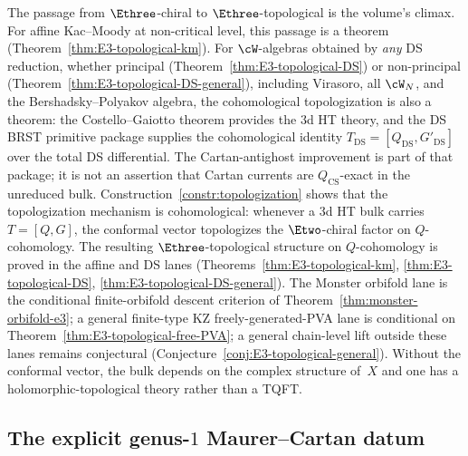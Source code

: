 \begin{remark}
\label{rem:E3-dichotomy-architecture}
The passage from $\Ethree$-chiral to $\Ethree$-topological is
the volume's climax. For affine Kac--Moody at non-critical
level, this passage is a theorem
\textup{(}Theorem~\ref{thm:E3-topological-km}\textup{)}.
For $\cW$-algebras obtained by \emph{any} DS reduction,
whether principal
\textup{(}Theorem~\ref{thm:E3-topological-DS}\textup{)} or
non-principal
\textup{(}Theorem~\ref{thm:E3-topological-DS-general}\textup{)},
including Virasoro, all $\cW_N$, and the Bershadsky--Polyakov
algebra, the cohomological topologization is also a theorem:
the Costello--Gaiotto theorem provides the $3$d HT theory,
and the DS BRST primitive package supplies the cohomological identity
$T_{\mathrm{DS}} = [Q_{\mathrm{DS}}, G'_{\mathrm{DS}}]$ over the
total DS differential.  The Cartan-antighost improvement is part of
that package; it is not an assertion that Cartan currents are
\(Q_{\mathrm{CS}}\)-exact in the unreduced bulk.
Construction~\ref{constr:topologization} shows that the
topologization mechanism is cohomological: whenever a $3$d HT
bulk carries $T=[Q,G]$, the conformal vector topologizes the
$\Etwo$-chiral factor on $Q$-cohomology. The resulting
$\Ethree$-topological structure on $Q$-cohomology is proved in the
affine and DS lanes
\textup{(}Theorems~\ref{thm:E3-topological-km},
\ref{thm:E3-topological-DS},
\ref{thm:E3-topological-DS-general}\textup{)}. The Monster orbifold
lane is the conditional finite-orbifold descent criterion of
Theorem~\ref{thm:monster-orbifold-e3}; a general finite-type KZ
freely-generated-PVA lane is conditional on
Theorem~\ref{thm:E3-topological-free-PVA}; a general chain-level lift
outside these lanes remains conjectural
\textup{(}Conjecture~\ref{conj:E3-topological-general}\textup{)}.
Without the conformal vector, the bulk depends on the complex
structure of~$X$ and one has a holomorphic-topological theory
rather than a TQFT.
\end{remark}


\subsection{The explicit genus-$1$ Maurer--Cartan datum}
\label{subsec:gravity-genus1-mc-datum}


